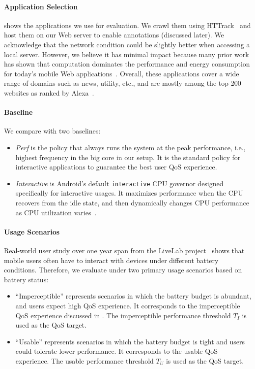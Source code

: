 \paragraph{Application Selection}  shows the applications we use for evaluation. We crawl them using HTTrack~\cite{httrack} and host them on our Web server to enable annotations (discussed later). We acknowledge that the network condition could be slightly better when accessing a local server. However, we believe it has minimal impact because many prior work has shown that computation dominates the performance and energy consumption for today's mobile Web applications~\cite{zhu2015role,huang2012close,big-little}. Overall, these applications cover a wide range of domains such as news, utility, etc., and are mostly among the top 200 websites as ranked by Alexa~\cite{alexa}.

\paragraph{Baseline} We compare \greenweb with two baselines:
\begin{itemize}
  \item \textit{Perf} is the policy that always runs the system at the peak performance, i.e., highest frequency in the big core in our setup. It is the standard policy for interactive applications to guarantee the best user QoS experience.
  
  \item \textit{Interactive} is Android's default \texttt{interactive} CPU governor designed specifically for interactive usages. It maximizes performance when the CPU recovers from the idle state, and then dynamically changes CPU performance as CPU utilization varies~\cite{android_cpufreq}.
\end{itemize}

\paragraph{Usage Scenarios} Real-world user study over one year span from the LiveLab project~\cite{livelab} shows that mobile users often have to interact with devices under different battery conditions. Therefore, we evaluate \greenweb under two primary usage scenarios based on battery status:
\begin{itemize}
  \item ``Imperceptible'' represents scenarios in which the battery budget is abundant, and users expect high QoS experience. It corresponds to the imperceptible QoS experience discussed in . The imperceptible performance threshold $T_I$ is used as the QoS target.
  
  \item ``Usable'' represents scenarios in which the battery budget is tight and users could tolerate lower performance. It corresponds to the usable QoS experience. The usable performance threshold $T_U$ is used as the QoS target.
\end{itemize}

